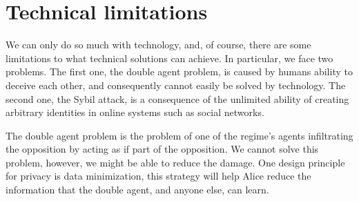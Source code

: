 \section{Technical limitations}

We can only do so much with technology, and, of course, there are some 
limitations to what technical solutions can achieve.
In particular, we face two problems.
The first one, the double agent problem, is caused by humans ability to deceive 
each other, and consequently cannot easily be solved by technology.
The second one, the Sybil attack, is a consequence of the unlimited ability of creating 
arbitrary identities in online systems such as social networks.

\label{DoubleAgentProblem}
The double agent problem is the problem of one of the regime's agents 
infiltrating the opposition by acting as if part of the opposition.
We cannot solve this problem, however, we might be able to reduce the damage.
One design principle for privacy is data minimization, this strategy will help 
Alice reduce the information that the double agent, and anyone else, can learn.

\label{SybilAttacks}


